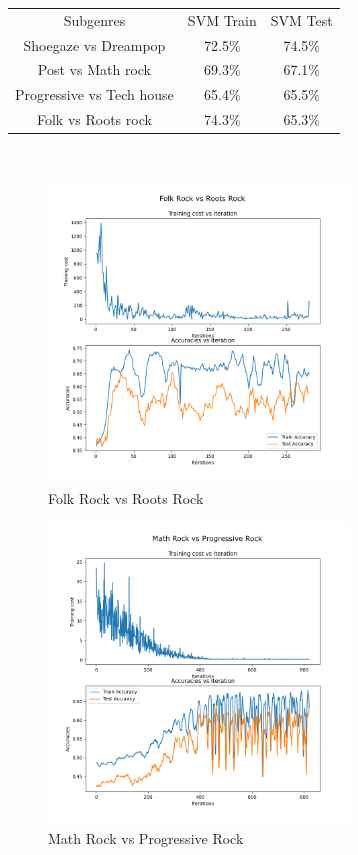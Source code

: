 \documentclass[letterpaper, 12 pt, conference]{ieeeconf}  %
\begin{document}
\begin{center}
    
    \begin{tabular}{ |c|c|c| }
 Subgenres & SVM Train & SVM Test \\ 
 Shoegaze vs Dreampop & 72.5\% & 74.5\% \\
 Post vs Math rock & 69.3\% & 67.1\% \\
 Progressive vs Tech house & 65.4\% & 65.5\% \\
 Folk vs Roots rock & 74.3\% & 65.3\% \\
\end{tabular}\\
\end{center}
\begin{figure}[t]
\includegraphics[width=8cm]{frrr_svm.png}
\caption{Folk Rock vs Roots Rock}
\end{figure}
\begin{figure}
\includegraphics[width=8cm]{mrpr_svm.png}
\caption{Math Rock vs Progressive Rock}
\end{figure}
\end{document}
